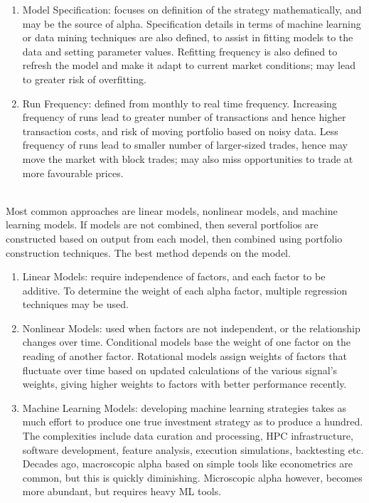 \begin{method}
\begin{enumerate}[label=\roman*.]
\item Model Specification: focuses on definition of the strategy mathematically, and may be the source of alpha. Specification details in terms of machine learning or data mining techniques are also defined, to assist in fitting models to the data and setting parameter values. Refitting frequency is also defined to refresh the model and make it adapt to current market conditions; may lead to greater risk of overfitting.
\item Run Frequency: defined from monthly to real time frequency. Increasing frequency of runs lead to greater number of transactions and hence higher transaction costs, and risk of moving portfolio based on noisy data. Less frequency of runs lead to smaller number of larger-sized trades, hence may move the market with block trades; may also miss opportunities to trade at more favourable prices.
\end{enumerate}
\end{method}

\begin{method} \\
Most common approaches are linear models, nonlinear models, and machine learning models. If models are not combined, then several portfolios are constructed based on output from each model, then combined using portfolio construction techniques. The best method depends on the model.
\begin{enumerate}[label=\roman*.]
\setlength{\itemsep}{0pt}
\item Linear Models: require independence of factors, and each factor to be additive. To determine the weight of each alpha factor, multiple regression techniques may be used.
\item Nonlinear Models: used when factors are not independent, or the relationship changes over time. Conditional models base the weight of one factor on the reading of another factor. Rotational models assign weights of factors that fluctuate over time based on updated calculations of the various signal's weights, giving higher weights to factors with better performance recently.
\item Machine Learning Models: developing machine learning strategies takes as much effort to produce one true investment strategy as to produce a hundred. The complexities include data curation and processing, HPC infrastructure, software development, feature analysis, execution simulations, backtesting etc.\\
Decades ago, macroscopic alpha based on simple tools like econometrics are common, but this is quickly diminishing. Microscopic alpha however, becomes more abundant, but requires heavy ML tools.
\end{enumerate}
\end{method}
